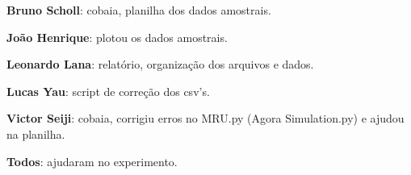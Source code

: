 \documentclass[a4paper, 12pt]{article}
\begin{document}
\textbf{Bruno Scholl}: cobaia, planilha dos dados amostrais.

\textbf{João Henrique}: plotou os dados amostrais.

\textbf{Leonardo Lana}: relatório, organização dos arquivos e dados.

\textbf{Lucas Yau}: script de correção dos csv's.

\textbf{Victor Seiji}: cobaia, corrigiu erros no MRU.py (Agora Simulation.py) e ajudou na planilha.

\textbf{Todos}: ajudaram no experimento.
\end{document}
